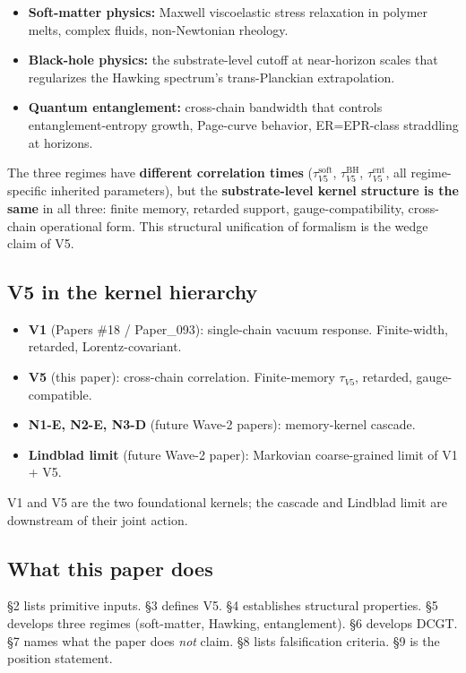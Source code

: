 \documentclass[11pt,a4paper]{article}
\begin{document}
\begin{itemize}[noitemsep]
\item \textbf{Soft-matter physics:} Maxwell viscoelastic stress relaxation in polymer melts, complex fluids, non-Newtonian rheology.
\item \textbf{Black-hole physics:} the substrate-level cutoff at near-horizon scales that regularizes the Hawking spectrum's trans-Planckian extrapolation.
\item \textbf{Quantum entanglement:} cross-chain bandwidth that controls entanglement-entropy growth, Page-curve behavior, ER=EPR-class straddling at horizons.
\end{itemize}

The three regimes have \textbf{different correlation times} ($\tau_{V5}^\mathrm{soft}$, $\tau_{V5}^\mathrm{BH}$, $\tau_{V5}^\mathrm{ent}$, all regime-specific inherited parameters), but the \textbf{substrate-level kernel structure is the same} in all three: finite memory, retarded support, gauge-compatibility, cross-chain operational form. This structural unification of formalism is the wedge claim of V5.

\subsection{V5 in the kernel hierarchy}

\begin{itemize}[noitemsep]
\item \textbf{V1} (Papers \#18 / Paper\_093): single-chain vacuum response. Finite-width, retarded, Lorentz-covariant.
\item \textbf{V5} (this paper): cross-chain correlation. Finite-memory $\tau_{V5}$, retarded, gauge-compatible.
\item \textbf{N1-E, N2-E, N3-D} (future Wave-2 papers): memory-kernel cascade.
\item \textbf{Lindblad limit} (future Wave-2 paper): Markovian coarse-grained limit of V1 + V5.
\end{itemize}

V1 and V5 are the two foundational kernels; the cascade and Lindblad limit are downstream of their joint action.

\subsection{What this paper does}

\S2 lists primitive inputs. \S3 defines V5. \S4 establishes structural properties. \S5 develops three regimes (soft-matter, Hawking, entanglement). \S6 develops DCGT. \S7 names what the paper does \emph{not} claim. \S8 lists falsification criteria. \S9 is the position statement.
\end{document}
